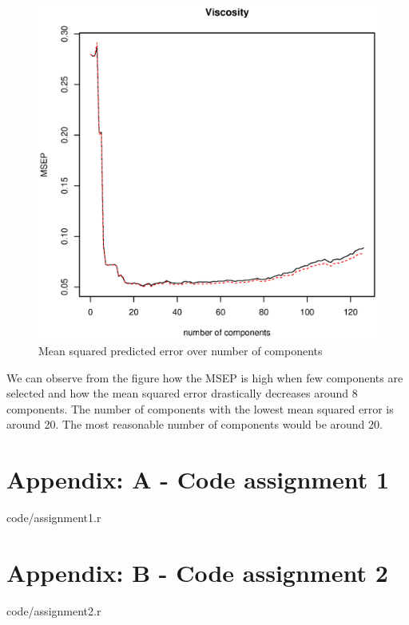 \documentclass[a4paper,12pt]{article}
\begin{document}
    \begin{figure}[H]            
    \centering
    \caption{Mean squared predicted error over number of components}
    \label{fig:viscosity}
    \includegraphics[width=\textwidth]{figures/A2_viscosity.eps}
    \end{figure}

    We can observe from the figure how the MSEP is high when few components are selected and how the mean squared error drastically decreases around 8 components. The number of components with the lowest mean squared error is around 20. The most reasonable number of components would be around 20.
    \newpage
    \section{Appendix: A - Code assignment 1}

    
    {code/assignment1.r}

    \section{Appendix: B - Code assignment 2}

    
    {code/assignment2.r}

    
\end{document}
